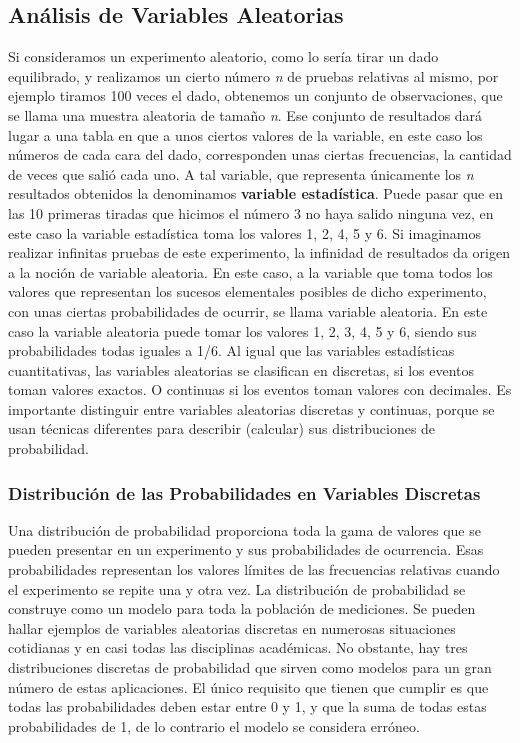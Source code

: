 \documentclass[]{article}
\begin{document}
\subsection{Análisis de Variables Aleatorias}
Si consideramos un experimento aleatorio, como lo sería tirar un dado equilibrado, y realizamos un cierto número \textit{n} de pruebas relativas al mismo, por ejemplo tiramos 100 veces el dado, obtenemos un conjunto de observaciones, que se llama una muestra aleatoria de tamaño \textit{n}. \newline
Ese conjunto de resultados dará lugar a una tabla en que a unos ciertos valores de la variable, en este caso los números de cada cara del dado, corresponden unas ciertas frecuencias, la cantidad de veces que salió cada uno. A tal variable, que representa únicamente los \textit{n} resultados obtenidos la denominamos \textbf{variable estadística}. Puede pasar que en las 10 primeras tiradas que hicimos el número 3 no haya salido ninguna vez, en este caso la variable estadística toma los valores 1, 2, 4, 5 y 6. \newline
Si imaginamos realizar infinitas pruebas de este experimento, la infinidad de resultados da origen a la noción de variable aleatoria. En este caso, a la variable que toma todos los valores que representan los sucesos elementales posibles de dicho experimento, con unas ciertas probabilidades de ocurrir, se llama variable aleatoria. En este caso la variable aleatoria puede tomar los valores 1, 2, 3, 4, 5 y 6, siendo sus probabilidades todas iguales a 1/6.
Al igual que las variables estadísticas cuantitativas, las variables aleatorias se clasifican en discretas, si los eventos toman valores exactos. O continuas si los eventos toman valores con decimales. Es importante distinguir entre variables aleatorias discretas y continuas, porque se usan técnicas diferentes para describir  (calcular) sus distribuciones de probabilidad.
\subsubsection*{Distribución de las Probabilidades en Variables Discretas}
Una distribución de probabilidad proporciona toda la gama de valores que se pueden presentar en un experimento y sus probabilidades de ocurrencia. Esas probabilidades representan los valores límites de las frecuencias relativas cuando el experimento se repite una y otra vez. La distribución de probabilidad se construye como un modelo para toda la población de mediciones. \newline
Se pueden hallar ejemplos de variables aleatorias discretas en numerosas situaciones cotidianas y en casi todas las disciplinas académicas. No obstante, hay tres distribuciones discretas de probabilidad que sirven como modelos para un gran número de estas aplicaciones. El único requisito que tienen que cumplir es que todas las probabilidades deben estar entre 0 y 1, y que la suma de todas estas probabilidades de 1, de lo contrario el modelo se considera erróneo.
\end{document}
